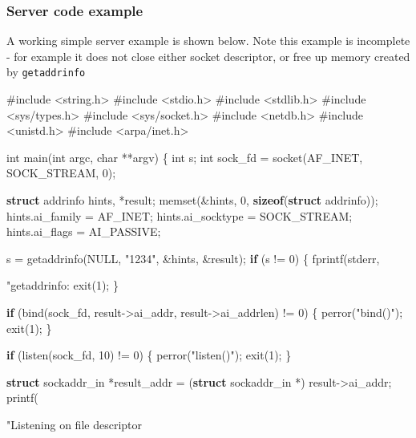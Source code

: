 \documentclass[]{article}
\newenvironment{Shaded}{}{}
\newcommand{\KeywordTok}[1]{\textcolor[rgb]{0.00,0.44,0.13}{\textbf{{#1}}}}
\newcommand{\DataTypeTok}[1]{\textcolor[rgb]{0.56,0.13,0.00}{{#1}}}
\newcommand{\DecValTok}[1]{\textcolor[rgb]{0.25,0.63,0.44}{{#1}}}
\newcommand{\CharTok}[1]{\textcolor[rgb]{0.25,0.44,0.63}{{#1}}}
\newcommand{\StringTok}[1]{\textcolor[rgb]{0.25,0.44,0.63}{{#1}}}
\newcommand{\OtherTok}[1]{\textcolor[rgb]{0.00,0.44,0.13}{{#1}}}
\newcommand{\NormalTok}[1]{{#1}}
\begin{document}
\subsubsection{Server code example}\label{server-code-example}

A working simple server example is shown below. Note this example is
incomplete - for example it does not close either socket descriptor, or
free up memory created by \texttt{getaddrinfo}

\begin{Shaded}
\begin{Highlighting}[]
\OtherTok{#include <string.h>}
\OtherTok{#include <stdio.h>}
\OtherTok{#include <stdlib.h>}
\OtherTok{#include <sys/types.h>}
\OtherTok{#include <sys/socket.h>}
\OtherTok{#include <netdb.h>}
\OtherTok{#include <unistd.h>}
\OtherTok{#include <arpa/inet.h>}

\DataTypeTok{int} \NormalTok{main(}\DataTypeTok{int} \NormalTok{argc, }\DataTypeTok{char} \NormalTok{**argv)}
\NormalTok{\{}
    \DataTypeTok{int} \NormalTok{s;}
    \DataTypeTok{int} \NormalTok{sock_fd = socket(AF_INET, SOCK_STREAM, }\DecValTok{0}\NormalTok{);}

    \KeywordTok{struct} \NormalTok{addrinfo hints, *result;}
    \NormalTok{memset(&hints, }\DecValTok{0}\NormalTok{, }\KeywordTok{sizeof}\NormalTok{(}\KeywordTok{struct} \NormalTok{addrinfo));}
    \NormalTok{hints.ai_family = AF_INET;}
    \NormalTok{hints.ai_socktype = SOCK_STREAM;}
    \NormalTok{hints.ai_flags = AI_PASSIVE;}

    \NormalTok{s = getaddrinfo(NULL, }\StringTok{"1234"}\NormalTok{, &hints, &result);}
    \KeywordTok{if} \NormalTok{(s != }\DecValTok{0}\NormalTok{) \{}
            \NormalTok{fprintf(stderr, }\StringTok{"getaddrinfo: %
            \NormalTok{exit(}\DecValTok{1}\NormalTok{);}
    \NormalTok{\}}

    \KeywordTok{if} \NormalTok{(bind(sock_fd, result->ai_addr, result->ai_addrlen) != }\DecValTok{0}\NormalTok{) \{}
        \NormalTok{perror(}\StringTok{"bind()"}\NormalTok{);}
        \NormalTok{exit(}\DecValTok{1}\NormalTok{);}
    \NormalTok{\}}

    \KeywordTok{if} \NormalTok{(listen(sock_fd, }\DecValTok{10}\NormalTok{) != }\DecValTok{0}\NormalTok{) \{}
        \NormalTok{perror(}\StringTok{"listen()"}\NormalTok{);}
        \NormalTok{exit(}\DecValTok{1}\NormalTok{);}
    \NormalTok{\}}
    
    \KeywordTok{struct} \NormalTok{sockaddr_in *result_addr = (}\KeywordTok{struct} \NormalTok{sockaddr_in *) result->ai_addr;}
    \NormalTok{printf(}\StringTok{"Listening on file descriptor %

}}
\end{Highlighting}
\end{Shaded}
\end{document}
